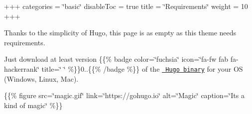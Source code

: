 +++ categories = \char`\"{}basic\char`\"{} disable\+Toc = true title = \char`\"{}\+Requirements\char`\"{} weight = 10 +++

Thanks to the simplicity of Hugo, this page is as empty as this theme needs requirements.

Just download at least version \{\{\% badge color=\char`\"{}fuchsia\char`\"{} icon=\char`\"{}fa-\/fw fab fa-\/hackerrank\char`\"{} title=\char`\"{} \char`\"{} \%\}\}0..\{\{\% /badge \%\}\} of the \href{https://gohugo.io/getting-started/installing/}{\texttt{ Hugo binary}} for your OS (Windows, Linux, Mac).

\{\{\% figure src=\char`\"{}magic.\+gif\char`\"{} link=\char`\"{}https\+://gohugo.\+io\char`\"{} alt=\char`\"{}\+Magic\char`\"{} caption=\char`\"{}\+It\textquotesingle{}s a kind of magic\char`\"{} \%\}\} 